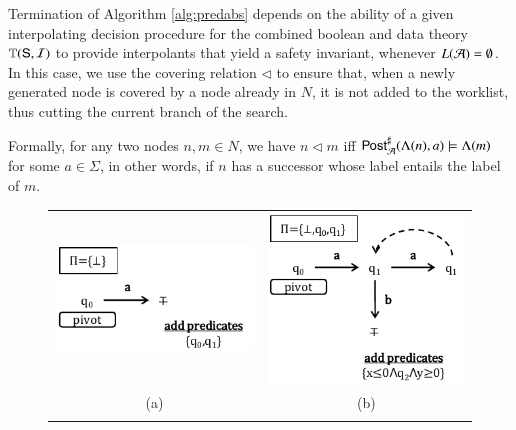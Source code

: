 \documentclass[10pt]{llncs}
\begin{document}
Termination of Algorithm \ref{alg:predabs} depends on the ability of a
given interpolating decision procedure for the combined boolean and
data theory $\mathbb{T}(\mathsf{S},\mathcal{I})$ to provide interpolants that yield a
safety invariant, whenever $L(\mathcal{A}) = \emptyset$. In this case, we use
the covering relation $\lhd$ to ensure that, when a newly generated
node is covered by a node already in $N$, it is not added to the
worklist, thus cutting the current branch of the search. 

Formally, for any two nodes $n,m \in N$, we have $n \lhd m$ iff
${\mathsf{Post}}^\sharp_{\mathcal{A}}(\Lambda(n),a) \models \Lambda(m)$ for some $a \in
\Sigma$, in other words, if $n$ has a successor whose label entails
the label of $m$.

\begin{figure}[htb]
\begin{center}
\begin{tabular}{cc}
\includegraphics[scale=0.5]{PA1.pdf} & \includegraphics[scale=0.5]{PA2.pdf} \\[-2mm]
\tiny{(a)} & \tiny{(b)} \\
\\

\end{tabular}
\end{center}
\end{figure}
\end{document}
